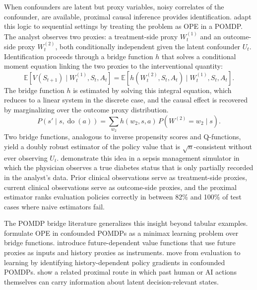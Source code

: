 When confounders are latent but proxy variables, noisy correlates of the confounder, are available, proximal causal inference provides identification. \citet{bennett2021proximal} adapt this logic to sequential settings by treating the problem as OPE in a POMDP. The analyst observes two proxies: a treatment-side proxy $W_t^{(1)}$ and an outcome-side proxy $W_t^{(2)}$, both conditionally independent given the latent confounder $U_t$. Identification proceeds through a bridge function $h$ that solves a conditional moment equation linking the two proxies to the interventional quantity:
\begin{equation}
\mathbb{E}[V(S_{t+1}) \mid W_t^{(1)}, S_t, A_t] = \mathbb{E}[h(W_t^{(2)}, S_t, A_t) \mid W_t^{(1)}, S_t, A_t].
\label{eq:bridge}
\end{equation}
The bridge function $h$ is estimated by solving this integral equation, which reduces to a linear system in the discrete case, and the causal effect is recovered by marginalizing over the outcome proxy distribution.
\begin{equation}
P(s' \mid s, \operatorname{do}(a)) = \sum_{w_2} h(w_2, s, a) \, P(W^{(2)}{=}w_2 \mid s).
\label{eq:proximal_adj}
\end{equation}
Two bridge functions, analogous to inverse propensity scores and Q-functions, yield a doubly robust estimator of the policy value that is $\sqrt{n}$-consistent without ever observing $U_t$. \citet{bennett2021proximal} demonstrate this idea in a sepsis management simulator in which the physician observes a true diabetes status that is only partially recorded in the analyst's data. Prior clinical observations serve as treatment-side proxies, current clinical observations serve as outcome-side proxies, and the proximal estimator ranks evaluation policies correctly in between 82\% and 100\% of test cases where naive estimators fail.

The POMDP bridge literature generalizes this insight beyond tabular examples. \citet{shiUeharaHuangJiang2022minimaxPOMDP} formulate OPE in confounded POMDPs as a minimax learning problem over bridge functions. \citet{ueharaEtAl2023futureDependent} introduce future-dependent value functions that use future proxies as inputs and history proxies as instruments. \citet{hongQiXu2024policyGradientPOMDP} move from evaluation to learning by identifying history-dependent policy gradients in confounded POMDPs. \citet{wangQiShi2025superPolicy} show a related proximal route in which past human or AI actions themselves can carry information about latent decision-relevant states.

